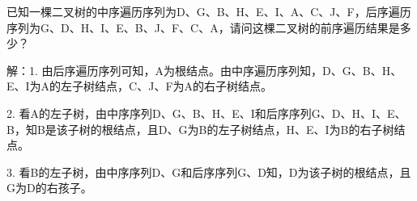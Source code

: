 %
%
%
%
%
%
%
%
%
%
\begin{frame}\ft{\secname}
\begin{wenti}
已知一棵二叉树的中序遍历序列为D、G、B、H、E、I、A、C、J、F，后序遍历序列为G、D、H、I、E、B、J、F、C、A，请问这棵二叉树的前序遍历结果是多少？
\end{wenti}
\pause
\textcolor{acolor3}{解：}1. 由后序遍历序列可知，A为根结点。由中序遍历序列知，D、G、B、H、E、I为A的左子树结点，C、J、F为A的右子树结点。
\begin{figure}
\centering

\end{figure}
\end{frame}
%
\begin{frame}\ft{\secname}
2. 看A的左子树，由中序序列D、G、B、H、E、I和后序序列G、D、H、I、E、B，知B是该子树的根结点，且D、G为B的左子树结点，H、E、I为B的右子树结点。
\begin{figure}
\centering

\end{figure}
\end{frame}
%
%
\begin{frame}\ft{\secname}  
3. 看B的左子树，由中序序列D、G和后序序列G、D知，D为该子树的根结点，且G为D的右孩子。
\begin{figure}
\centering

\end{figure}
\end{frame}

